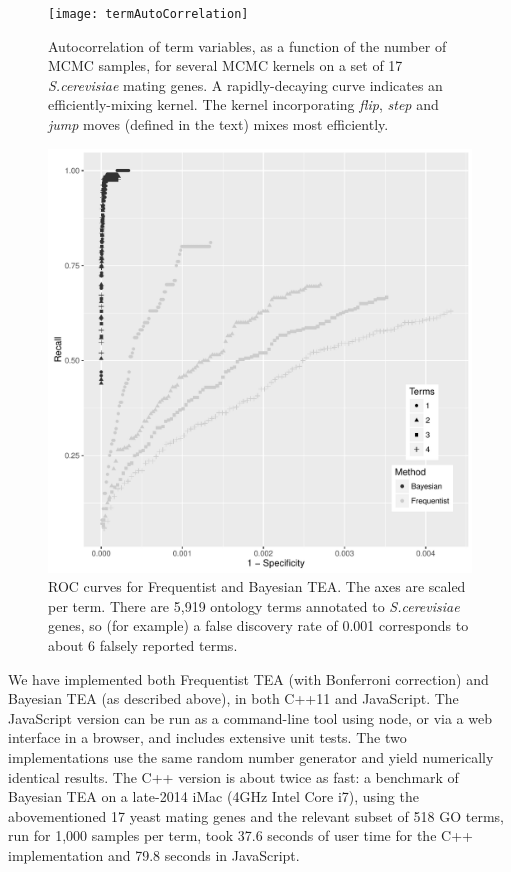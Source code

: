 \begin{figure}
\texttt{[image: termAutoCorrelation]}
\caption{
  \label{fig:termauto}
  Autocorrelation of term variables, as a function of the number of MCMC samples, for several MCMC kernels on a set of 17 {\em S.cerevisiae} mating genes.
  A rapidly-decaying curve indicates an efficiently-mixing kernel.
  The kernel incorporating {\em flip}, {\em step} and {\em jump} moves (defined in the text) mixes most efficiently.
}
\end{figure}

\begin{figure}
\includegraphics[width=\columnwidth]{allsim.pdf}
\caption{
  \label{fig:simresults}
  ROC curves for Frequentist and Bayesian TEA. The axes are scaled per term.
  There are 5,919 ontology terms annotated to {\em S.cerevisiae} genes, so (for example)
  a false discovery rate of 0.001 corresponds to about 6 falsely reported terms.
}
\end{figure}

We have implemented both Frequentist TEA (with Bonferroni correction) and Bayesian TEA (as described above), in both C++11 and JavaScript.
The JavaScript version can be run as a command-line tool using node, or via a web interface in a browser, and includes extensive unit tests.
The two implementations use the same random number generator and yield numerically identical results.
The C++ version is about twice as fast:
a benchmark of Bayesian TEA on a late-2014 iMac (4GHz Intel Core i7),
using the abovementioned 17 yeast mating genes and the relevant subset of 518 GO terms, run for 1,000 samples per term,
took 37.6 seconds of user time for the C++ implementation and 79.8 seconds in JavaScript.

